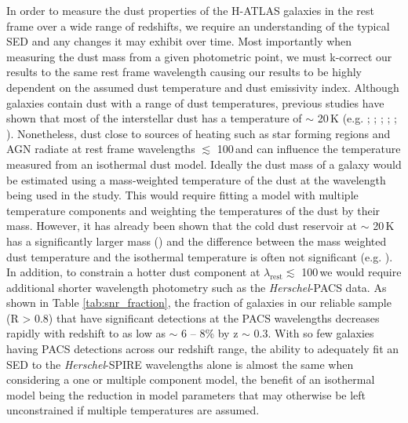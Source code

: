 In order to measure the dust properties of the H-ATLAS galaxies in the rest frame over a wide range of redshifts, we require an understanding of the typical SED and any changes it may exhibit over time. Most importantly when measuring the dust mass from a given photometric point, we must k-correct our results to the same rest frame wavelength causing our results to be highly dependent on the assumed dust temperature and dust emissivity index. Although galaxies contain dust with a range of dust temperatures, previous studies have shown that most of the interstellar dust has a temperature of $\sim$ 20\,K (e.g. \citealt{Dunne_2001}; \citealt{Vlahakis_2005}; \citealt{Draine_2007}; \citealt{Boselli_2010}; \citealt{Smith_2012b}; \citealt{Smith_2013}). Nonetheless, dust close to sources of heating such as star forming regions and AGN radiate at rest frame wavelengths $\lesssim$ 100\,\micron and can influence the temperature measured from an isothermal dust model. Ideally the dust mass of a galaxy would be estimated using a mass-weighted temperature of the dust at the wavelength being used in the study. This would require fitting a model with multiple temperature components and weighting the temperatures of the dust by their mass. However, it has already been shown that the cold dust reservoir at $\sim$ 20\,K has a significantly larger mass (\citealt{Pearson_2013}) and the difference between the mass weighted dust temperature and the isothermal temperature is often not significant (e.g. \citealt{Clark_2015}). In addition, to constrain a hotter dust component at $\lambda_{\textrm{rest}} \lesssim$ 100\,\micron we would require additional shorter wavelength photometry such as the \textit{Herschel}-PACS data. As shown in Table \ref{tab:snr_fraction}, the fraction of galaxies in our reliable sample (R > 0.8) that have significant detections at the PACS wavelengths decreases rapidly with redshift to as low as $\sim$ 6 -- 8\% by z $\sim$ 0.3. With so few galaxies having PACS detections across our redshift range, the ability to adequately fit an SED to the \textit{Herschel}-SPIRE wavelengths alone is almost the same when considering a one or multiple component model, the benefit of an isothermal model being the reduction in model parameters that may otherwise be left unconstrained if multiple temperatures are assumed.

